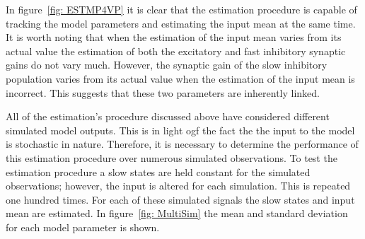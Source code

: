 In figure~\ref{fig: ESTMP4VP} it is clear that the estimation procedure is capable of tracking the model parameters and estimating the input mean at the same time. It is worth noting that when the estimation of the input mean varies from its actual value the estimation of both the excitatory and fast inhibitory synaptic gains do not vary much. However, the synaptic gain of the slow inhibitory population varies from its actual value when the estimation of the input mean is incorrect. This suggests that these two parameters are inherently linked. 



All of the estimation's procedure discussed above have considered different simulated model outputs. This is in light ogf the fact the the input to the model is stochastic in nature. Therefore, it is necessary to determine the performance of this estimation procedure over numerous simulated observations. To test the estimation procedure a slow states are held constant for the simulated observations; however, the input is altered for each simulation. This is repeated one hundred times. For each of these simulated signals the slow states and input mean are estimated. In figure~\ref{fig: MultiSim} the mean and standard deviation for each model parameter is shown. 

